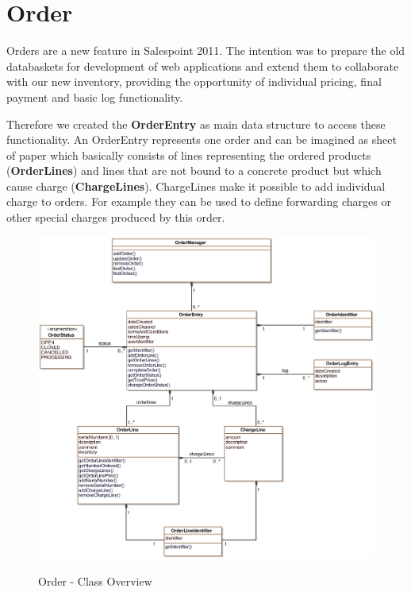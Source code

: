 \newpage
\section{Order}
Orders are a new feature in Salespoint 2011. The intention was to prepare the old databaskets for development of web applications and extend them to collaborate with our new inventory, providing the opportunity of individual pricing, final payment and basic log functionality.

Therefore we created the \textbf{OrderEntry} as main data structure to access these functionality. An OrderEntry represents one order and can be imagined as sheet of paper which basically consists of lines representing the ordered products (\textbf{OrderLines}) and lines that are not bound to a concrete product but which cause charge (\textbf{ChargeLines}). ChargeLines make it possible to add individual charge to orders. For example they can be used to define forwarding charges or other special charges produced by this order. 

\vskip 1cm

\begin{figure}[ht]
	\centering
  \includegraphics[scale =.7]{images/Overview_Order.eps}
	\label{order_overview}
	\caption{Order - Class Overview}
\end{figure}


